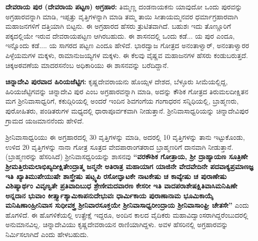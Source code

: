 \textbf{ದೇವರಾಯ ಪುರ (ದೇವರಾಯ ಪಟ್ಟಣ) ಅಗ್ರಹಾರ:} ತಿಮ್ಮಣ್ಣ ದಂಡನಾಯಕನು ಯಾವುದೋ ಒಂದು ಪುರವನ್ನು ಅಗ್ರಹಾರವನ್ನಾಗಿ ಮಾಡಿ, ಇಪ್ಪತ್ತು ವೃತ್ತಿಗಳನ್ನಾಗಿ ಮಾಡಿ ತಮ್ಮ ತಾಯಿ ಸೀತಾಯಮ್ಮನವರ ಧರ್ಮಾಗ್ರಹಾರವಾಗಿ ಮಹಾಜನಗಳಿಗೆ ದತ್ತಿಯಾಗಿ ಬಿಟ್ಟನು. ಈ ಅಗ್ರಹಾರದ ಹೆಸರು ತ್ರುಟಿತವಾಗಿದೆ. ಬಹುಶಃ ಇದು ತೊಣ್ಣೂರಿಗೆ ಪಕ್ಕದಲ್ಲಿಯೇ ಇರುವ ದೇವರಾಯಪಟ್ಟಣ ಆಗಿರಬಹುದು. ಈ ಶಾಸನದಲ್ಲಿ ಒಂದು ಕಡೆ... ಯ ಪುರ ಎಂದೂ, ಇನ್ನೊಂದು ಕಡೆ.... ಯ ಸಾಗರದ ಪಟ್ಟಣ ಎಂದೂ ಹೇಳಿದೆ. ಭಾರದ್ವಾಜ ಗೋತ್ರದ ಅನಂತಾಳ್ವಾರ್​, ಅನಂತಾಳ್ವಾರರ ಪಿಳ್ಳೆಯಮಗಳ ಮಕ್ಕಳು, ರಾಮಾನುಜಯ್ಯಗಳ ಮಕ್ಕಳು. ಈ ಕೆಲವು ವೈಷ್ಣವ ಮಹಾಜನಗಳ ಹೆಸರು ಕಂಡುಬರುತ್ತದೆ. ಚಿಕ್ಕಅಠವಣೆಯ ಮಾದರಸನೆಂಬ ಅಧಿಕಾರಿಯು ಈ ಶಾಸನವನ್ನು ಬರೆದಿದ್ದಾನೆ.

\textbf{ಚಿನ್ನಾದೇವಿ ಪುರವಾದ ಹಿರಿಯಜೆಟ್ಟಿಗ:} ಕೃಷ್ಣದೇವರಾಯನು ಹೊಯ್ಸಳ ದೇಶದ, ಬೆಳ್ಳೂರು ಸೀಮೆಯಲ್ಲಿದ್ದ, ಹಿರಿಯಜೆಟ್ಟಿಗವನ್ನು ಚಿನ್ನಾದೇವಿ ಪುರ ಎಂಬ ಅಗ್ರಹಾರವನ್ನಾಗಿ ಮಾಡಿ, ಅದನ್ನು ಕೌಶಿಕ ಗೋತ್ರದ ತಿರುಮಲದೀಕ್ಷಿತನ ಮಗ ಶ‍್ರೀನಿವಾಸಾಧ್ವರಿಗೆ, ಕಕುದ್ಗಿರಿಯಲ್ಲಿ ಅಂದರೆ ಇಂದಿನ ಶಿವಗಂಗೆಯ ಗಂಗಾಧರನ ಸನ್ನಿಧಿಯಲ್ಲಿ, ಬ್ರಾಹ್ಮಣರು, ಪುರೋಹಿತರು, ಪಂಡಿತರುಗಳ ಮಧ್ಯದಲ್ಲಿ ಧಾರಾಪೂರ್ವಕವಾಗಿ ನೀಡುತ್ತಾನೆ. ಶ‍್ರೀನಿವಾಸಾಧ್ವರಿಯನ್ನು ಚಿನ್ನಾದೇವಿಪುರ ಗ್ರಾಮದ ಯಜಮಾನನೆಂದು ಹೇಳಿದೆ. 

ಶ‍್ರೀನಿವಾಸಾಧ್ವರಿಯು ಈ ಅಗ್ರಹಾರದಲ್ಲಿ 30 ವೃತ್ತಿಗಳನ್ನು ಮಾಡಿ, ಅದರಲ್ಲಿ 10 ವೃತ್ತಿಗಳನ್ನು ತಾನು ಇಟ್ಟುಕೊಂಡು, ಉಳಿದ 20 ವೃತ್ತಿಗಳನ್ನು ನಾನಾ ಗೋತ್ರ ಸೂತ್ರದ ವೇದಪಾರಾಂಗತರಾದ ಬ್ರಾಹ್ಮಣರಿಗೆ ದಾನವಾಗಿ ನೀಡುತ್ತಾನೆ. (ಬ್ರಾಹ್ಮಣರನ್ನು ಹೆಸರಿಸಿದೆ) ಶ‍್ರೀನಿವಾಸಧ್ವರಿಯನ್ನು ಶಾಸನವು \textbf{“ವರಕೌಶಿಕ ಗೋತ್ರಾಯ, ಶ‍್ರೀ ದ್ರಾಹ್ಯಾಯಣ ಸೂತ್ರಿಣೇ ಶ‍್ರೀಮತ್ತಿರುಮಲಾಭಿಖ್ಯದೀಕ್ಷಿತೇಂದ್ರಾತ್ಮ ಜನ್ಮನೇ ಅತಿರಾತ್ರ ಮಹಾಯಾಗ ಯಾಜಿನೇ ವೇದವೇದಿನೇ ಪದವಾಕ್ಯಪ್ರಮಾಣಜ್ಞ ಇತಿ ಖ್ಯಾತಿಮುಪೇಯುಷೇ ಶಾಸ್ತ್ರೇಷು ಷಟ್ಸ್ವಪಿ ರಸೋದ್ಘಾಟಕೇ ನಾಟಕೇಷು ಚ ಕಾವ್ಯೇಷು ಚ ಪುರಾಣೇಷು ವಿಶಿಷ್ಯಾರ್ಥಂ ವಿವೃಣ್ವತೇ ಪ್ರತಿವಾದಿಬುಧ ಶ್ರೇಣೀಮದವಾರಣ ಕೇಸರೀ ಇತಿ ವಾದಪರಾಶೇಷಕ್ಷಿತಿವಾಸಿಮನಿಷಿಣೇ ಅನ್ನದಾನ ಭುವಾಂ ಕೀರ್ತ್ತ್ಯಾಶ್ಯಾಮಿಕಾಪನುದೇಭುವಃ ಧಾರ್ಮಿಕಾಯ ಪುರಾಣಾನಾಮ ಭೂಮಿಕಾಯೈ ಮನಿಷಿಣಾಂಹ್ರೀನಿವಾಸ ಸುಧೀವಕ್ತ್ರ ಶ‍್ರೀನಿವಾರಸೂಕ್ತಯೇ ಶ‍್ರೀನಿವಾಸಾಧ್ವರೀಂದ್ರಾಯ ಶ‍್ರೀನಿವಾಸಾಂಘ್ರಿ ಚೇತಸೇ”} ಎಂದು ಹೊಗಳಿದೆ. ಈ ಹೊಗಳಿಕೆಯಲ್ಲಿ ಉತ್ಪ್ರೇಕ್ಷೆ ಇದ್ದರೂ, ಅಂದಿನ ಕಾಲದ ವೈದಿಕರು ಮಹಾವಿದ್ವಾಂಸರಾಗಿದ್ದರೆಂಬುದರಲ್ಲಿ ಅನುಮಾನವಿಲ್ಲ. ಚಿನ್ನಾದೇವಿಯು ಕೃಷ್ಣದೇವರಾಯನ ರಾಣಿಯಾಗಿದ್ದಳು. ಅವಳ ಹೆಸರಿನಲ್ಲಿ ಅಗ್ರಹಾರವನ್ನು ನಿರ್ಮಿಸಲಾಗಿದೆ ಎಂದು ಹೇಳಬಹುದು.

